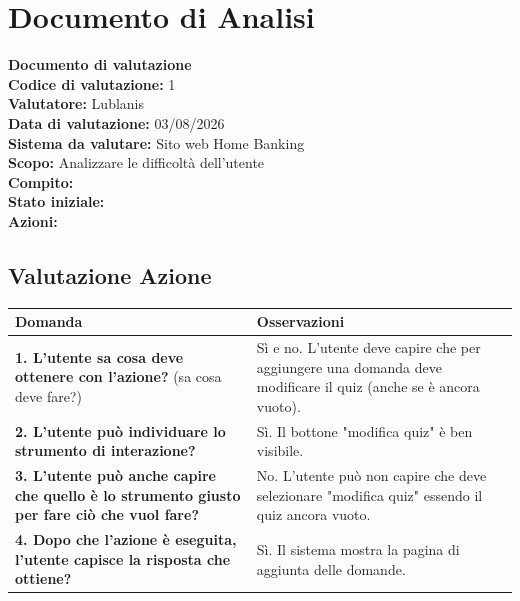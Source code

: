 \documentclass[12pt,a4paper]{article}
\newcommand{\cognitivetable}[4]{%
	\begin{center}
		\renewcommand{\arraystretch}{1.5}
		\begin{tabularx}{\linewidth}{|X|X|}
			\hline 
			\textbf{Domanda} & \textbf{Osservazioni}
			\\ \hline
			\textbf{1. L'utente sa cosa deve ottenere con l'azione?} (sa cosa deve fare?) & #1 \\ \hline
			\textbf{2. L'utente può individuare lo strumento di interazione?} & #2 \\ \hline
			\textbf{3. L'utente può anche capire che quello è lo strumento giusto per fare ciò che vuol fare?} & #3 \\ \hline
			\textbf{4. Dopo che l'azione è eseguita, l'utente capisce la risposta che ottiene?} & #4 \\ \hline
		\end{tabularx}
	\end{center}
}
\begin{document}
	
	\section*{Documento di Analisi}
	
	\noindent
	\textbf{Documento di valutazione}\\[0.5em]
	\textbf{Codice di valutazione:} 1 \\
	\textbf{Valutatore:} Lublanis \\
	\textbf{Data di valutazione:} 03/08/2026 \\
	\textbf{Sistema da valutare:} Sito web Home Banking \\
	\textbf{Scopo:} Analizzare le difficoltà dell'utente \\
	\textbf{Compito:} \\
	\textbf{Stato iniziale:} \\
	\textbf{Azioni:} 
	
	\vspace{1em}
	
	\subsection*{Valutazione Azione}
	
	\cognitivetable{%
		\textcolor{negativeRed}{Sì e no. L'utente deve capire che per aggiungere una domanda deve modificare il quiz (anche se è ancora vuoto).}%
	}{%
		Sì. Il bottone "modifica quiz" è ben visibile.%
	}{%
		\textcolor{negativeRed}{No. L'utente può non capire che deve selezionare "modifica quiz" essendo il quiz ancora vuoto.}%
	}{%
		Sì. Il sistema mostra la pagina di aggiunta delle domande.%
	}
	
\end{document}
